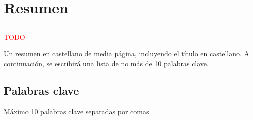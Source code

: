 \chapter*{Resumen}

\section*{\tituloPortadaVal}

\textcolor{red}{TODO}

Un resumen en castellano de media página, incluyendo el título en castellano. A continuación, se escribirá una lista de no más de 10 palabras clave.

\section*{Palabras clave}
   
\noindent Máximo 10 palabras clave separadas por comas

